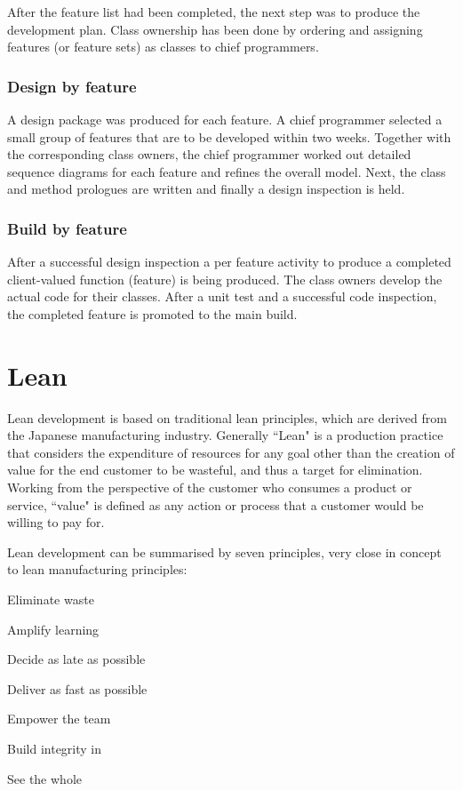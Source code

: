 After the feature list had been completed, the next step was to produce the development plan. Class ownership has been done by ordering and assigning features (or feature sets) as classes to chief programmers.

\subsubsection{Design by feature}

A design package was produced for each feature. A chief programmer selected a small group of features that are to be developed within two weeks. Together with the corresponding class owners, the chief programmer worked out detailed sequence diagrams for each feature and refines the overall model. Next, the class and method prologues are written and finally a design inspection is held.

\subsubsection{Build by feature}

After a successful design inspection a per feature activity to produce a completed client-valued function (feature) is being produced. The class owners develop the actual code for their classes. After a unit test and a successful code inspection, the completed feature is promoted to the main build.

\section{Lean}

Lean development is based on traditional lean principles, which are derived from the Japanese manufacturing industry. Generally ``Lean" is a production practice that considers the expenditure of resources for any goal other than the creation of value for the end customer to be wasteful, and thus a target for elimination. Working from the perspective of the customer who consumes a product or service, ``value" is defined as any action or process that a customer would be willing to pay for.

Lean development can be summarised by seven principles, very close in concept to lean manufacturing principles:
\begin{compactenum}
\item Eliminate waste
\item Amplify learning
\item Decide as late as possible
\item Deliver as fast as possible
\item Empower the team
\item Build integrity in
\item See the whole
\end{compactenum}

